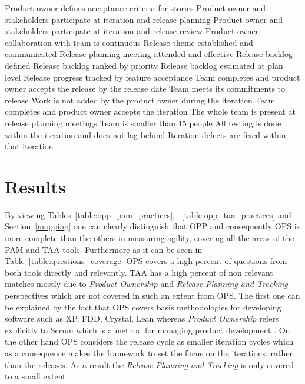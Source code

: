 \begin{itemize}
	\taanr Product owner defines acceptance criteria for stories 
	\taanr Product owner and stakeholders participate at iteration and release planning 
	\taanr Product owner and stakeholders participate at iteration and release review 
	\taanr Product owner collaboration with team is continuous 
	\taanr Release theme established and communicated 
	\taanr Release planning meeting attended and effective 
	\taanr Release backlog defined 
	\taanr Release backlog ranked by priority 
	\taanr Release backlog estimated at plan level 
	\taanr Release progress tracked by feature acceptance 
	\taanr Team completes and product owner accepts the release by the release date
	\taanr Team meets its commitments to release 
	\taanr Work is not added by the product owner during the iteration 
	\taanr Team completes and product owner accepts the iteration 
	\taanr The whole team is present at release planning meetings 
	\taanr Team is smaller than 15 people 
	\taanr All testing is done within the iteration and does not lag behind 
	\taanr Iteration defects are fixed within that iteration 
\end{itemize}

\section{Results}
By viewing Tables~\ref{table:opp_pam_practices}, ~\ref{table:opp_taa_practices} and Section~\ref{mapping} one can clearly distinguish that OPP and consequently OPS is more complete than the others in measuring agility, covering all the areas of the PAM and TAA tools. Furthermore as it can be seen in Table~\ref{table:questions_coverage} OPS covers a high percent of questions from both tools directly and relevantly. TAA has a high percent of non relevant matches mostly due to \textit{Product Ownership} and \textit{Release Planning and Tracking} perspectives which are not covered in such an extent from OPS. The first one can be explained by the fact that OPS covers basis methodologies for developing software such as XP, FDD, Crystal, Lean \cite[p. 44]{sventha_dissertation} whereas \textit{Product Ownership} refers explicitly to Scrum which is a method for managing product development \cite{koch2005agile}. On the other hand OPS considers the release cycle as smaller iteration cycles \cite[p. 13]{sventha_dissertation} which as a consequence makes the framework to set the focus on the iterations, rather than the releases. As a result the \textit{Release Planning and Tracking} is only covered to a small extent.

